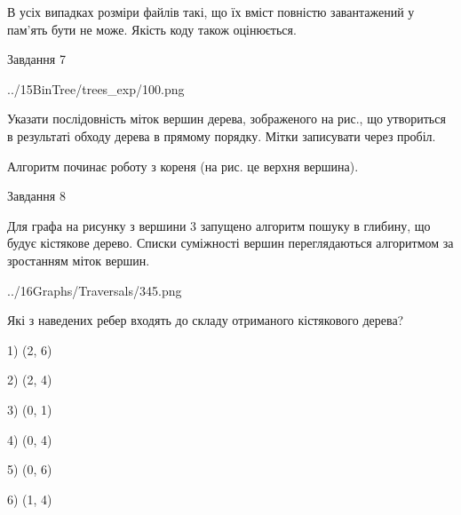 \documentclass[12pt, ukrainian]{article}
\begin{document}
{В усіх випадках розміри файлів такі, що їх вміст повністю завантажений у пам'ять бути не може. Якість коду також оцінюється.



\vspace{10mm}\par

\newpage
\begin{minipage}[t]{9.7cm}
               
{\begin{center}Завдання {7}\end{center}}
\vspace{-4mm}

\begin{center}
	{../15BinTree/trees_exp/100.png}
\end{center}
Указати послідовність міток вершин дерева, зображеного на рис., що утвориться в результаті обходу дерева в прямому порядку. Мітки записувати через пробіл.\par Алгоритм починає роботу з кореня (на рис. це верхня вершина).\par

\end{minipage}
\vline \hspace{8mm}
\begin{minipage}[t]{8.0cm}
               
{\begin{center}Завдання {8}\end{center}}
\vspace{-4mm}
Для графа на рисунку з вершини 3 запущено алгоритм пошуку в глибину, що будує кістякове дерево. Списки суміжності вершин переглядаються алгоритмом за зростанням міток вершин.\par
\begin{center}
	{../16Graphs/Traversals/345.png}
\end{center}
\par Які з наведених ребер входять до складу отриманого кістякового дерева?\par
1) (2, 6)\par
2) (2, 4)\par
3) (0, 1)\par
4) (0, 4)\par
5) (0, 6)\par
6) (1, 4)\par
{\vskip 15pt} \par


\end{minipage}}
\end{document}
